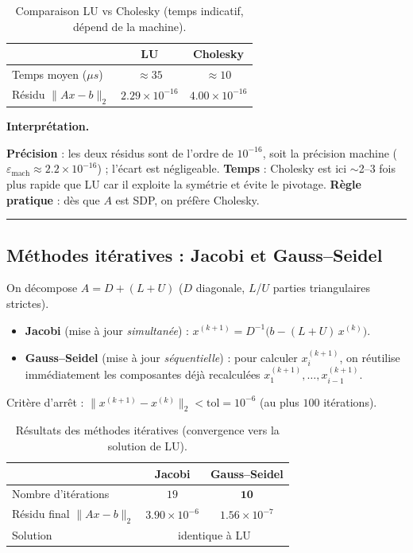 \documentclass[11pt,a4paper]{article}
\newenvironment{interpret}{%
  \par\medskip\noindent
  \setlength{\fboxsep}{8pt}%
  \begin{lrbox}{\interpretbox}%
  \begin{minipage}{\dimexpr\linewidth-2\fboxsep-4pt\relax}%
  \textbf{\textcolor{boxline}{Interprétation.}}\;\ignorespaces
}{%
  \end{minipage}%
  \end{lrbox}%
  \noindent\textcolor{boxline}{\rule{3pt}{\dimexpr\ht\interpretbox+\dp\interpretbox\relax}}%
  \colorbox{boxgray}{\usebox{\interpretbox}}%
  \par\medskip
}
\begin{document}
\begin{table}[H]\centering
\caption{Comparaison LU vs Cholesky (temps indicatif, dépend de la machine).}
\begin{tabular}{lcc}
\toprule
 & \textbf{LU} & \textbf{Cholesky}\\
\midrule
Temps moyen ($\mu s$) & $\approx 35$ & $\approx 10$\\
Résidu $\lVert Ax-b\rVert_2$ & $2.29\times10^{-16}$ & $4.00\times10^{-16}$\\
\bottomrule
\end{tabular}
\end{table}

\begin{interpret}
\textbf{Précision} : les deux résidus sont de l'ordre de $10^{-16}$, soit la précision machine
($\varepsilon_{\text{mach}}\approx2.2\times10^{-16}$) ; l'écart est négligeable.
\textbf{Temps} : Cholesky est ici $\sim$2--3 fois plus rapide que LU car il exploite la symétrie
et évite le pivotage. \textbf{Règle pratique} : dès que $A$ est SDP, on préfère Cholesky.
\end{interpret}

\subsection{Méthodes itératives : Jacobi et Gauss--Seidel}
On décompose $A=D+(L+U)$ ($D$ diagonale, $L$/$U$ parties triangulaires strictes).
\begin{itemize}[nosep]
\item \textbf{Jacobi} (mise à jour \emph{simultanée}) : $x^{(k+1)} = D^{-1}\big(b-(L+U)\,x^{(k)}\big)$.
\item \textbf{Gauss--Seidel} (mise à jour \emph{séquentielle}) : pour calculer $x_i^{(k+1)}$, on
réutilise immédiatement les composantes déjà recalculées $x_1^{(k+1)},\dots,x_{i-1}^{(k+1)}$.
\end{itemize}
Critère d'arrêt : $\lVert x^{(k+1)}-x^{(k)}\rVert_2 < \text{tol}=10^{-6}$ (au plus $100$ itérations).

\begin{table}[H]\centering
\caption{Résultats des méthodes itératives (convergence vers la solution de LU).}
\begin{tabular}{lcc}
\toprule
 & \textbf{Jacobi} & \textbf{Gauss--Seidel}\\
\midrule
Nombre d'itérations & $19$ & $\mathbf{10}$\\
Résidu final $\lVert Ax-b\rVert_2$ & $3.90\times10^{-6}$ & $1.56\times10^{-7}$\\
Solution & \multicolumn{2}{c}{identique à LU}\\
\bottomrule
\end{tabular}
\end{table}
\end{document}
